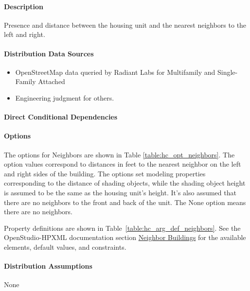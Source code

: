 \paragraph{Description}
% 
Presence and distance between the housing unit and the nearest neighbors to the left and right.

\paragraph{Distribution Data Sources}
% 
\begin{itemize}
    \item OpenStreetMap data queried by Radiant Labs for Multifamily and Single-Family Attached
    \item Engineering judgment for others.
\end{itemize}

\paragraph{Direct Conditional Dependencies}


\paragraph{Options}
The options for Neighbors are shown in Table \ref{table:hc_opt_neighbors}. The option values correspond to distances in feet to the nearest neighbor on the left and right sides of the building. The options set modeling properties corresponding to the distance of shading objects, while the shading object height is assumed to be the same as the housing unit's height. It's also assumed that there are no neighbors to the front and back of the unit. The None option means there are no neighbors.



Property definitions are shown in Table~\ref{table:hc_arg_def_neighbors}. See the OpenStudio-HPXML documentation section \href{https://openstudio-hpxml.readthedocs.io/en/v1.10.0/workflow_inputs.html#hpxml-neighbor-buildings}{Neighbor Buildings} for the available elements, default values, and constraints.



\paragraph{Distribution Assumptions}
% 
None
